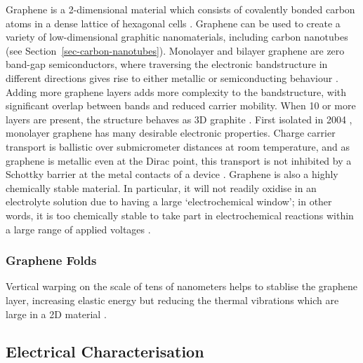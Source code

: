 \documentclass[
  a4paper,
]{scrbook}
\begin{document}
Graphene is a 2-dimensional material which consists of covalently bonded
carbon atoms in a dense lattice of hexagonal cells
\autocite{McEuen2002,Novoselov2004,Geim2007,Tran2016}. Graphene can be
used to create a variety of low-dimensional graphitic nanomaterials,
including carbon nanotubes \autocite{McEuen2002} (see
Section~\ref{sec-carbon-nanotubes}). Monolayer and bilayer graphene are
zero band-gap semiconductors, where traversing the electronic
bandstructure in different directions gives rise to either metallic or
semiconducting behaviour \autocite{McEuen2002}. Adding more graphene
layers adds more complexity to the bandstructure, with significant
overlap between bands and reduced carrier mobility. When 10 or more
layers are present, the structure behaves as 3D graphite
\autocite{Geim2007,Ohno2015}. First isolated in 2004
\autocite{Novoselov2004}, monolayer graphene has many desirable
electronic properties. Charge carrier transport is ballistic over
submicrometer distances at room temperature, and as graphene is metallic
even at the Dirac point, this transport is not inhibited by a Schottky
barrier at the metal contacts of a device
\autocite{Novoselov2004,Geim2007}. Graphene is also a highly chemically
stable material. In particular, it will not readily oxidise in an
electrolyte solution due to having a large `electrochemical window'; in
other words, it is too chemically stable to take part in electrochemical
reactions within a large range of applied voltages
\autocite{Ohno2015,Tran2016}.

\hypertarget{graphene-folds}{%
\subsubsection*{Graphene Folds}\label{graphene-folds}}

Vertical warping on the scale of tens of nanometers helps to stablise
the graphene layer, increasing elastic energy but reducing the thermal
vibrations which are large in a 2D material \autocite{Geim2007}.

\hypertarget{sec-electrical-characterisation-graphene}{%
\subsection{Electrical
Characterisation}\label{sec-electrical-characterisation-graphene}}
\end{document}

